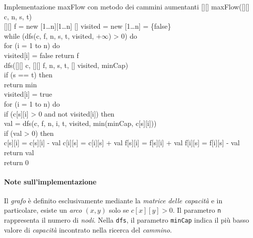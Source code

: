\begin{minicode}{Implementazione maxFlow con metodo dei cammini aumentanti}
\ind{}[][] maxFlow([][] c,  n,  s,  t)\\
    [][] f = new [1\dots n][1\dots n]\hfill{}
    [] visited = new [1\dots n] = \{false\}\\
    \indf while (dfs(c, f, n, s, t, visited, $+\infty$) > 0) do\\
        \indff for (i = 1 to n) do\\
            visited[i] = false\hfill{}
    \indf return f\\

\nl{}
\rmindent\ind{} dfs([][] c, [][] f,   n,  s,
     t, [] visited, \:minCap)\\
    \indf if (s == t) then\\
        return min\\
    \indf visited[i] = true\\
    \indf for (i = 1 to n) do\\
        \indff if (c[s][i] > 0 and not visited[i]) then\\
             val = dfs(c, f, n, i, t, visited, min(minCap, c[s][i]))\\
            \indfff if (val > 0) then\\
                c[s][i] = c[s][i] - val\hfill{}
                c[i][s] = c[i][s] + val\hfill{}
                f[s][i] = f[s][i] + val\hfill{}
                f[i][s] = f[i][s] - val\hfill{}
                return val\\
    \indf return 0\hfill{}
\end{minicode}

\paragraph{Note sull'implementazione}
Il \emph{grafo} è definito esclusivamente mediante la \emph{matrice delle
capacità} e in particolare, esiste un \emph{arco} $(x,y)$ solo se $c[x][y]>0$.
Il parametro \texttt{n} rappresenta il numero di \emph{nodi}. Nella
\texttt{dfs}, il parametro \texttt{minCap} indica il più basso valore di
\emph{capacità} incontrato nella ricerca del \emph{cammino}.